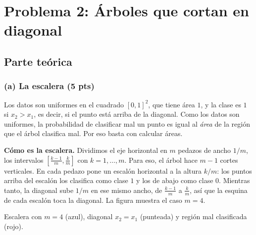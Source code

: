 \documentclass[11pt, letterpaper]{article}
\begin{document}
\clearpage
\section{Problema 2: Árboles que cortan en diagonal}

\subsection{Parte teórica}

\subsubsection*{(a) La escalera (5 pts)}

Los datos son uniformes en el cuadrado $[0,1]^2$, que tiene área $1$, y la clase es $1$ si $x_2 > x_1$, es decir, si el punto está arriba de la diagonal. Como los datos son uniformes, la probabilidad de clasificar mal un punto es igual al \emph{área} de la región que el árbol clasifica mal. Por eso basta con calcular áreas.

\textbf{Cómo es la escalera.} Dividimos el eje horizontal en $m$ pedazos de ancho $1/m$, los intervalos $\left[\frac{k-1}{m}, \frac{k}{m}\right]$ con $k = 1, \dots, m$. Para eso, el árbol hace $m - 1$ cortes verticales. En cada pedazo pone un escalón horizontal a la altura $k/m$: los puntos arriba del escalón los clasifica como clase $1$ y los de abajo como clase $0$. Mientras tanto, la diagonal sube $1/m$ en ese mismo ancho, de $\frac{k-1}{m}$ a $\frac{k}{m}$, así que la esquina de cada escalón toca la diagonal. La figura muestra el caso $m = 4$.

\begin{center}

\small Escalera con $m = 4$ (azul), diagonal $x_2 = x_1$ (punteada) y región mal clasificada (rojo).
\end{center}
\end{document}
